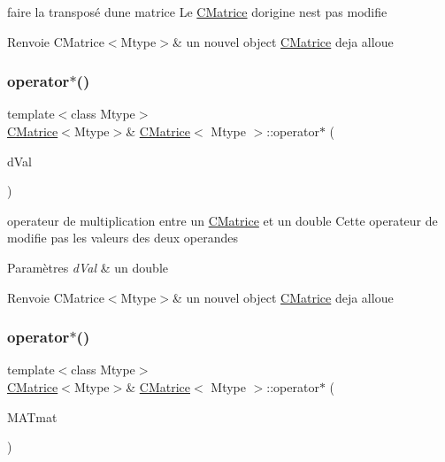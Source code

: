 faire la transposé d\textquotesingle{}une matrice Le \hyperlink{classCMatrice}{C\+Matrice} d\textquotesingle{}origine n\textquotesingle{}est pas modifie 

\begin{DoxyReturn}{Renvoie}
C\+Matrice$<$\+Mtype$>$\& un nouvel object \hyperlink{classCMatrice}{C\+Matrice} deja alloue 
\end{DoxyReturn}
\mbox{\label{classCMatrice_a453717391e9ba371410f0cef98d6ba6d}} 
\subsubsection{\texorpdfstring{operator$\ast$()}{operator*()}\hspace{0.1cm}{\footnotesize\ttfamily [1/2]}}
{\footnotesize\ttfamily template$<$class Mtype$>$ \\
\hyperlink{classCMatrice}{C\+Matrice}$<$Mtype$>$\& \hyperlink{classCMatrice}{C\+Matrice}$<$ Mtype $>$\+::operator$\ast$ (\begin{DoxyParamCaption}\item[{double}]{d\+Val }\end{DoxyParamCaption})\hspace{0.3cm}{\ttfamily [inline]}}



operateur de multiplication entre un \hyperlink{classCMatrice}{C\+Matrice} et un double Cette operateur de modifie pas les valeurs des deux operandes 


\begin{DoxyParams}{Paramètres}
{\em d\+Val} & un double \\
\hline
\end{DoxyParams}
\begin{DoxyReturn}{Renvoie}
C\+Matrice$<$\+Mtype$>$\& un nouvel object \hyperlink{classCMatrice}{C\+Matrice} deja alloue 
\end{DoxyReturn}
\mbox{\label{classCMatrice_a9ee14d1166b8ecd56dd8273b79fd00c2}} 
\subsubsection{\texorpdfstring{operator$\ast$()}{operator*()}\hspace{0.1cm}{\footnotesize\ttfamily [2/2]}}
{\footnotesize\ttfamily template$<$class Mtype$>$ \\
\hyperlink{classCMatrice}{C\+Matrice}$<$Mtype$>$\& \hyperlink{classCMatrice}{C\+Matrice}$<$ Mtype $>$\+::operator$\ast$ (\begin{DoxyParamCaption}\item[{\hyperlink{classCMatrice}{C\+Matrice}$<$ Mtype $>$ \&}]{M\+A\+Tmat }\end{DoxyParamCaption})\hspace{0.3cm}{\ttfamily [inline]}}




